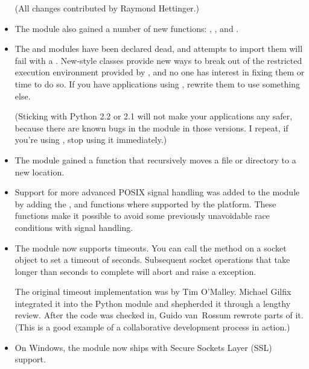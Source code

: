 \documentclass{howto}
\begin{document}
\begin{itemize}
(All changes contributed by Raymond Hettinger.)

\item The  module also gained a number of new
functions: ,
, and .

\item The  and  modules have been
declared dead, and attempts to import them will fail with a
.  New-style classes provide new ways to break
out of the restricted execution environment provided by
, and no one has interest in fixing them or time to do
so.  If you have applications using , rewrite them to
use something else.

(Sticking with Python 2.2 or 2.1 will not make your applications any
safer, because there are known bugs in the  module in
those versions.  I repeat, if you're using , stop using
it immediately.)

\item The  module gained a  function that recursively moves a file or directory to a new
location.

\item Support for more advanced POSIX signal handling was added
to the  module by adding the ,
 and  functions where supported
by the platform.  These functions make it possible to avoid some previously
unavoidable race conditions with signal handling.

\item The  module now supports timeouts.  You
can call the  method on a socket object to
set a timeout of  seconds.  Subsequent socket operations that
take longer than  seconds to complete will abort and raise a
 exception.

The original timeout implementation was by Tim O'Malley.  Michael
Gilfix integrated it into the Python  module and
shepherded it through a lengthy review.  After the code was checked
in, Guido van~Rossum rewrote parts of it.  (This is a good example of
a collaborative development process in action.)

\item On Windows, the  module now ships with Secure 
Sockets Layer (SSL) support.


\end{itemize}
\end{document}
